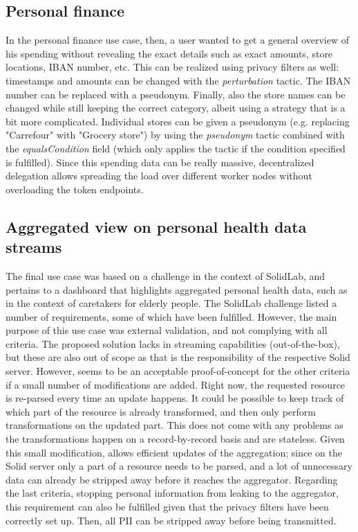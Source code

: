 \subsection{Personal finance}
In the personal finance use case, then, a user wanted to get a general overview of his spending without revealing the exact details such as exact amounts, store locations, IBAN number, etc. This can be realized using privacy filters as well: timestamps and amounts can be changed with the \textit{perturbation} tactic. The IBAN number can be replaced with a pseudonym. Finally, also the store names can be changed while still keeping the correct category, albeit using a strategy that is a bit more complicated. Individual stores can be given a pseudonym (e.g. replacing "Carrefour" with "Grocery store") by using the \textit{pseudonym} tactic combined with the \textit{equalsCondition} field (which only applies the tactic if the condition specified is fulfilled). Since this spending data can be really massive, decentralized delegation allows spreading the load over different worker nodes without overloading the token endpoints.

\subsection{Aggregated view on personal health data streams}
The final use case was based on a challenge in the context of SolidLab, and pertains to a dashboard that highlights aggregated personal health data, such as in the context of caretakers for elderly people. The SolidLab challenge listed a number of requirements, some of which have been fulfilled. However, the main purpose of this use case was external validation, and not complying with all criteria. 
The proposed solution lacks in streaming capabilities (out-of-the-box), but these are also out of scope as that is the responsibility of the respective Solid server. 
However, \middleware{} seems to be an acceptable proof-of-concept for the other criteria if a small number of modifications are added. Right now, the requested resource is re-parsed every time an update happens. It could be possible to keep track of which part of the resource is already transformed, and then only perform transformations on the updated part. This does not come with any problems as the transformations happen on a record-by-record basis and are stateless. Given this small modification, \middleware{} allows efficient updates of the aggregation; since on the Solid server only a part of a resource needs to be parsed, and a lot of unnecessary data can already be stripped away before it reaches the aggregator. 
Regarding the last criteria, stopping personal information from leaking to the aggregator, this requirement can also be fulfilled given that the privacy filters have been correctly set up. Then, all \gls{PII} can be stripped away before being transmitted.

